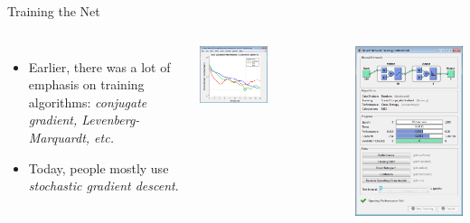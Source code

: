\documentclass[10pt, aspectratio=169]{beamer} %
\begin{document}
\begin{frame}{Training the Net}
	\begin{columns}
	\begin{itemize}
		\item Earlier, there was a lot of emphasis on training algorithms: \emph{conjugate gradient, Levenberg-Marquardt, etc.}
		\item Today, people mostly use \emph{stochastic gradient descent}.
	\end{itemize}
	\centerline{\includegraphics[width=0.5\textwidth]{nn_toolbox_training_error.png}}
	\includegraphics[width=\textwidth]{nn_toolbox.png}
	\end{columns}
\end{frame}
\end{document}
